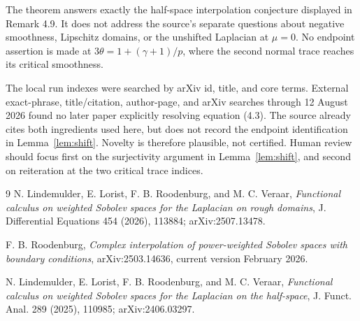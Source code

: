 \documentclass[11pt]{article}
\begin{document}
The theorem answers exactly the half-space interpolation conjecture displayed
in Remark 4.9.  It does not address the source's separate questions about
negative smoothness, Lipschitz domains, or the unshifted Laplacian at
$\mu=0$.  No endpoint assertion is made at
$3\theta=1+(\gamma+1)/p$, where the second normal trace reaches its critical
smoothness.

The local run indexes were searched by arXiv id, title, and core terms.
External exact-phrase, title/citation, author-page, and arXiv searches through
12 August 2026 found no later paper explicitly resolving equation (4.3).
The source already cites both ingredients used here, but does not record the
endpoint identification in Lemma~\ref{lem:shift}.  Novelty is therefore
plausible, not certified.  Human review should focus first on the surjectivity
argument in Lemma~\ref{lem:shift}, and second on reiteration at the two critical
trace indices.

\begin{thebibliography}{9}
N. Lindemulder, E. Lorist, F. B. Roodenburg, and M. C. Veraar,
\emph{Functional calculus on weighted Sobolev spaces for the Laplacian on
rough domains}, J. Differential Equations 454 (2026), 113884;
arXiv:2507.13478.

F. B. Roodenburg,
\emph{Complex interpolation of power-weighted Sobolev spaces with boundary
conditions}, arXiv:2503.14636, current version February 2026.

N. Lindemulder, E. Lorist, F. B. Roodenburg, and M. C. Veraar,
\emph{Functional calculus on weighted Sobolev spaces for the Laplacian on the
half-space}, J. Funct. Anal. 289 (2025), 110985; arXiv:2406.03297.
\end{thebibliography}
\end{document}
